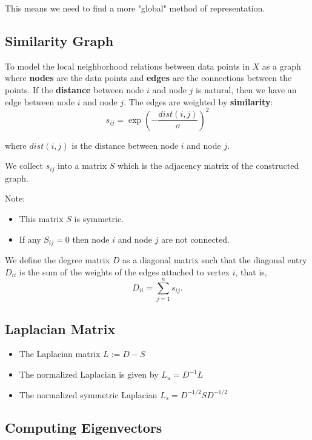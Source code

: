 This means we need to find a more "global" method of representation.

\subsection{Similarity Graph}

To model the local neighborhood relations between data points in \( X \) as a graph where
\textbf{nodes} are the data points and \textbf{edges} are the connections between the points.
If the \textbf{distance} between node \( i \) and node \( j \) is natural, then we have an 
edge between node \( i \) and node \( j \). The edges are weighted by \textbf{similarity}:
\[ s_{ij} = \exp\left(-\frac{dist(i,j)}{\sigma}\right)^2 \]

where \( dist(i,j) \) is the distance between node \( i \) and node \( j \).

We collect \( s_{ij} \) into a matrix \( S \) which is the adjacency matrix of the constructed graph.
\begin{mdframed}
    Note:
    \begin{itemize}
        \item This matrix \( S \) is symmetric.
        \item If any \( S_{ij} = 0 \) then node \( i \) and node \( j \) are not connected.
    \end{itemize}
\end{mdframed}
    
We define the degree matrix \( D \) as a diagonal matrix such that the diagonal 
entry \( D_{ii} \) is the sum of the weights of the edges attached to vertex \( i \),
that is,
$$ D_{ii} = \sum_{j=1}^{n} s_{ij}. $$

\subsection{Laplacian Matrix}

\begin{itemize}
    \item The Laplacian matrix \( L := D - S \)
    \item The normalized Laplacian is given by $L_{u} = D^{-1} L$
    \item The normalized symmetric Laplacian $ L_s = D^{-1/2} S D^{-1/2}$
\end{itemize}


\subsection{Computing Eigenvectors}

